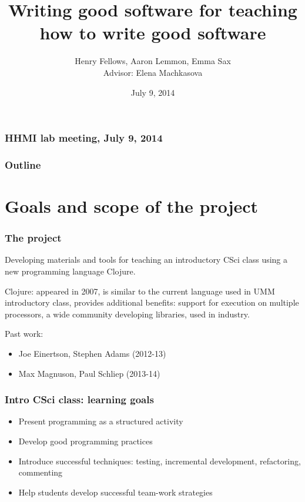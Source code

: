 \documentclass{beamer}
\begin{document}
\author[Henry Fellows, Aaron Lemmon, Emma Sax]
{Henry Fellows, Aaron Lemmon, Emma Sax
\\ Advisor: Elena Machkasova}
\title{Writing good software for teaching how to write good software}
\date{July 9, 2014}

\begin{frame}
\frametitle{HHMI lab meeting, July 9, 2014}

\maketitle

\end{frame}

\begin{frame}[fragile]
\frametitle{Outline}
	\tableofcontents
\end{frame}


\section{Goals and scope of the project}

\begin{frame}[fragile]
\frametitle{The project}
Developing materials and tools for teaching an introductory CSci class using a new programming language Clojure.

Clojure: appeared in 2007, is similar to the current language used in UMM introductory class, provides additional benefits:
support for execution on multiple processors, a wide community developing libraries, used in industry.

Past work: 
\begin{itemize}
\item Joe Einertson, Stephen Adams (2012-13)
\item  Max Magnuson, Paul Schliep (2013-14)
\end{itemize}  
\end{frame}

\begin{frame}[fragile]
\frametitle{Intro CSci class: learning goals}
\begin{itemize}
\item Present programming as a structured activity
\item Develop good programming practices
\item Introduce successful techniques: testing, incremental development, refactoring, commenting 
\item Help students develop successful team-work strategies
\end{itemize}
\end{frame}
\end{document}
